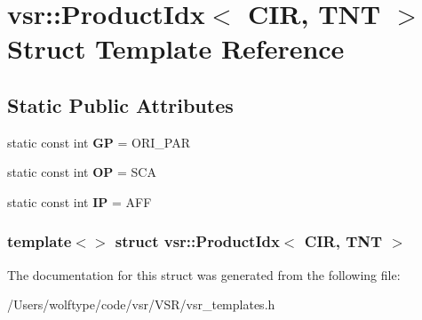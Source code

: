 \hypertarget{structvsr_1_1_product_idx_3_01_c_i_r_00_01_t_n_t_01_4}{\section{vsr\-:\-:Product\-Idx$<$ C\-I\-R, T\-N\-T $>$ Struct Template Reference}
\label{structvsr_1_1_product_idx_3_01_c_i_r_00_01_t_n_t_01_4}
}
\subsection*{Static Public Attributes}
\begin{DoxyCompactItemize}
\item 
\hypertarget{structvsr_1_1_product_idx_3_01_c_i_r_00_01_t_n_t_01_4_ac2f8df997a9e64a5ff0906a95a2e0c56}{static const int {\bfseries G\-P} = O\-R\-I\-\_\-\-P\-A\-R}\label{structvsr_1_1_product_idx_3_01_c_i_r_00_01_t_n_t_01_4_ac2f8df997a9e64a5ff0906a95a2e0c56}

\item 
\hypertarget{structvsr_1_1_product_idx_3_01_c_i_r_00_01_t_n_t_01_4_ae254e1591bd3460c73c48e703d30746e}{static const int {\bfseries O\-P} = S\-C\-A}\label{structvsr_1_1_product_idx_3_01_c_i_r_00_01_t_n_t_01_4_ae254e1591bd3460c73c48e703d30746e}

\item 
\hypertarget{structvsr_1_1_product_idx_3_01_c_i_r_00_01_t_n_t_01_4_a61bb52bc77a90177cc60a05f5a28b1bf}{static const int {\bfseries I\-P} = A\-F\-F}\label{structvsr_1_1_product_idx_3_01_c_i_r_00_01_t_n_t_01_4_a61bb52bc77a90177cc60a05f5a28b1bf}

\end{DoxyCompactItemize}
\subsubsection*{template$<$$>$ struct vsr\-::\-Product\-Idx$<$ C\-I\-R, T\-N\-T $>$}



The documentation for this struct was generated from the following file\-:\begin{DoxyCompactItemize}
\item 
/\-Users/wolftype/code/vsr/\-V\-S\-R/vsr\-\_\-templates.\-h\end{DoxyCompactItemize}
